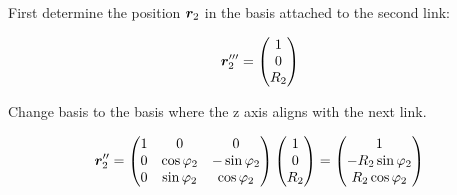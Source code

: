 First determine the position $\bm{r}_2$ in the basis attached to the
second link:

\noindent
\begin{minipage}{0.35\textwidth}
  \centering
\end{minipage}\hfill
\begin{minipage}{0.6\textwidth}
  \[
    \bm{r}_2^{\prime\prime\prime} =
    \begin{pmatrix} 1 \\ 0 \\ R_2 \end{pmatrix}
  \]
\end{minipage}

\medskip

Change basis to the basis where the z axis aligns with the next link. 

\noindent
\begin{minipage}{0.35\textwidth}
  \centering
\end{minipage}\hfill
\begin{minipage}{0.6\textwidth}
  \[
    \bm{r}_2^{\prime\prime} =
    \begin{pmatrix}
      1 & 0 & 0 \\
      0 & \cos\varphi_2 & -\sin\varphi_2 \\
      0 & \sin\varphi_2 & \cos\varphi_2
    \end{pmatrix}
    \begin{pmatrix} 1 \\ 0 \\ R_2 \end{pmatrix}
    =
    \begin{pmatrix} 1 \\ -R_2\sin\varphi_2 \\ R_2\cos\varphi_2 \end{pmatrix}
  \]
\end{minipage}

